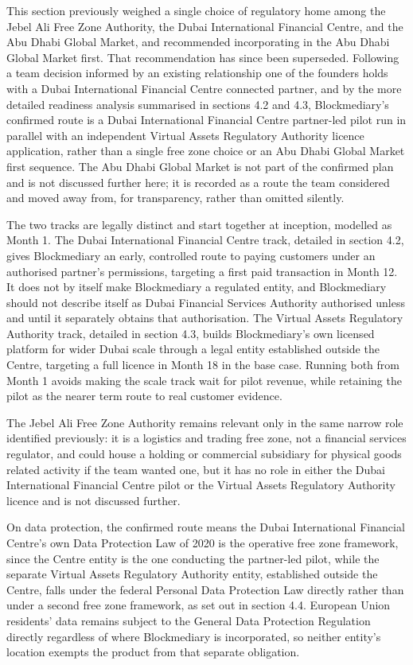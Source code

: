 \documentclass[12pt, a4paper]{article}
\begin{document}
This section previously weighed a single choice of regulatory home among the Jebel Ali
Free Zone Authority, the Dubai International Financial Centre, and the Abu Dhabi Global
Market, and recommended incorporating in the Abu Dhabi Global Market first. That
recommendation has since been superseded. Following a team decision informed by an
existing relationship one of the founders holds with a Dubai International Financial
Centre connected partner, and by the more detailed readiness analysis summarised in
sections 4.2 and 4.3, Blockmediary's confirmed route is a Dubai International Financial
Centre partner-led pilot run in parallel with an independent Virtual Assets Regulatory
Authority licence application, rather than a single free zone choice or an Abu Dhabi Global
Market first sequence. The Abu Dhabi Global Market is not part of the confirmed plan and is
not discussed further here; it is recorded as a route the team considered and moved away
from, for transparency, rather than omitted silently.

The two tracks are legally distinct and start together at inception, modelled as Month 1.
The Dubai International Financial Centre track, detailed in section 4.2, gives
Blockmediary an early, controlled route to paying customers under an authorised partner's
permissions, targeting a first paid transaction in Month 12. It does not by itself make
Blockmediary a regulated entity, and Blockmediary should not describe itself as Dubai
Financial Services Authority authorised unless and until it separately obtains that
authorisation. The Virtual Assets Regulatory Authority track, detailed in section 4.3,
builds Blockmediary's own licensed platform for wider Dubai scale through a legal entity
established outside the Centre, targeting a full licence in Month 18 in the base case.
Running both from Month 1 avoids making the scale track wait for pilot revenue, while
retaining the pilot as the nearer term route to real customer evidence.

The Jebel Ali Free Zone Authority remains relevant only in the same narrow role
identified previously: it is a logistics and trading free zone, not a financial services
regulator, and could house a holding or commercial subsidiary for physical goods related
activity if the team wanted one, but it has no role in either the Dubai International
Financial Centre pilot or the Virtual Assets Regulatory Authority licence and is not
discussed further.

On data protection, the confirmed route means the Dubai International Financial Centre's
own Data Protection Law of 2020 is the operative free zone framework, since the Centre
entity is the one conducting the partner-led pilot, while the separate Virtual Assets
Regulatory Authority entity, established outside the Centre, falls under the federal
Personal Data Protection Law directly rather than under a second free zone framework, as
set out in section 4.4. European Union residents' data remains subject to the General
Data Protection Regulation directly regardless of where Blockmediary is incorporated, so
neither entity's location exempts the product from that separate obligation.
\end{document}
